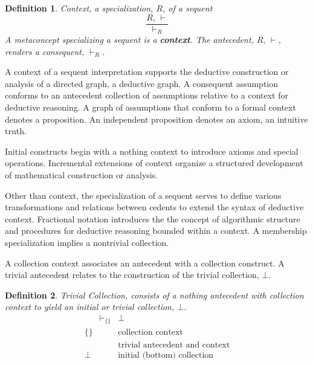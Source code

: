 \documentclass[aps,twocolumn,secnumarabic,nobalancelastpage,amsmath,amssymb,
amsthm,nofootinbib,parskip=full]{revtex4}
\numberwithin{equation}{section}
\newtheorem{definition}{Definition}[section]
\begin{document}
\begin{definition}{Context}\label{def:context},
  a specialization, $R$, of a sequent
\begin{equation*}
\frac{R,\,\vdash}{\vdash_R}
\end{equation*}  
A metaconcept specializing a sequent is a \textbf{context}.
The antecedent, $R,\,\vdash$, renders a consequent, $\vdash_R$.
\end{definition}

A context of a sequent interpretation supports the deductive
construction or analysis of a directed graph, a deductive graph.
A consequent assumption conforms to an antecedent collection of assumptions
relative to a context for deductive reasoning.
A graph of assumptions that conform to a formal context denotes a proposition.
An independent proposition denotes an axiom, an intuitive truth.

Initial constructs begin with a nothing context to introduce
axioms and special operations.
Incremental extensions of context organize a structured development
of mathematical construction or analysis.

Other than context, the specialization of a sequent serves to
define various transformations and relations between cedents to
extend the syntax of deductive context.
Fractional notation introduces the the concept of algorithmic structure
and procedures for deductive reasoning bounded within a context.
A membership specialization implies a nontrivial collection.

A collection context associates an antecedent with a collection
construct.
A trivial antecedent relates to the construction of the
trivial collection, $\bot$.

\begin{definition}{Trivial Collection}\label{def:trivialcollection},
  consists of a nothing antecedent with collection context to yield
  an initial or trivial collection, $\bot$.
  \begin{equation*}
  \begin{array}{rll}
   &\vdash_{\{\}}&\bot \\[3pt]
   \{\}&\quad&\text{collection context} \\[3pt]
   &\quad&\text{trivial antecedent and context} \\[3pt]
   \bot&\quad&\text{initial (bottom) collection}
  \end{array}
  \end{equation*}
\end{definition}
\end{document}

